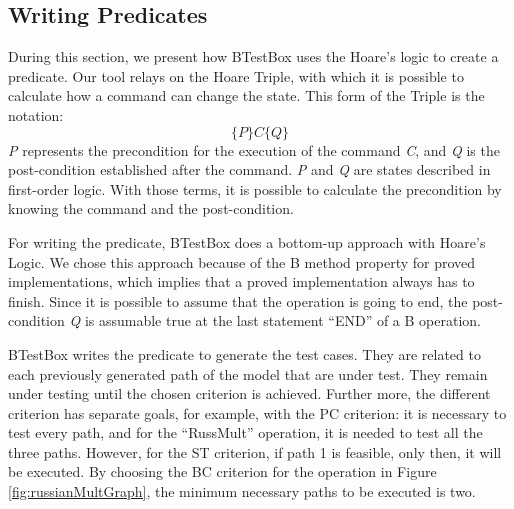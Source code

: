 \documentclass[runningheads]{llncs}
\begin{document}
\subsection{Writing Predicates} \label{writingPredicates}

During this section, we present how BTestBox uses the Hoare’s logic to create a predicate. Our tool relays on the Hoare Triple, with which it is possible to calculate how a command can change the state. 
This form of the Triple is the notation:\noindent \nolinebreak[4] $$\{P\} C \{Q\}$$ \nolinebreak[4] \noindent
\textit{P} represents the precondition for the execution of the command \textit{C}, and \textit{Q} is the post-condition established after the command. \textit{P} and \textit{Q} are states described in first-order logic. With those terms, it is possible to calculate the precondition by knowing the command and the post-condition. 

For writing the predicate, BTestBox does a bottom-up approach with Hoare's Logic. We chose this approach because of the B method property for proved implementations, which implies that a proved implementation always has to finish. Since it is possible to assume that the operation is going to end, the post-condition \textit{Q} is assumable true at the last statement ``END'' of a B operation.


 BTestBox writes the predicate to generate the test cases. They are related to each previously generated path of the model that are under test. They remain under testing until the chosen criterion is achieved. Further more, the different criterion has separate goals, for example, with the PC criterion: it is necessary to test every path, and for the ``RussMult'' operation, it is needed to test all the three paths. However, for the ST criterion, if path 1 is feasible, only then, it will be executed. By choosing the BC criterion for the operation in Figure \ref{fig:russianMultGraph}, the minimum necessary paths to be executed is two.
\end{document}
